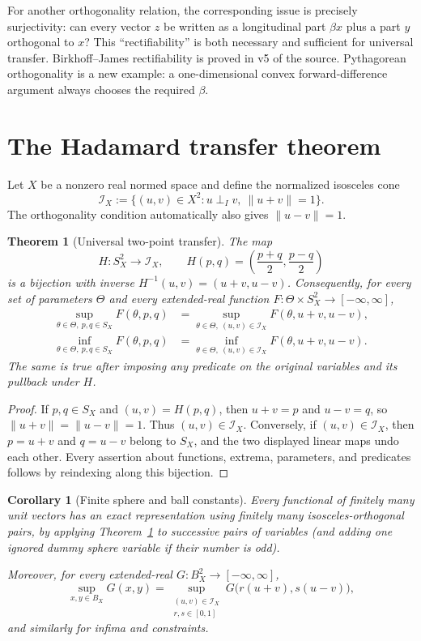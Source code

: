 \documentclass[11pt]{article}
\newtheorem{theorem}{Theorem}
\newtheorem{corollary}{Corollary}
\newcommand{\SX}{S_X}
\newcommand{\BX}{B_X}
\newcommand{\perpI}{\mathrel{\perp_I}}
\begin{document}
For another orthogonality relation, the corresponding issue is precisely
surjectivity: can every vector $z$ be written as a longitudinal part
$\beta x$ plus a part $y$ orthogonal to $x$?  This ``rectifiability'' is both
necessary and sufficient for universal transfer.  Birkhoff--James
rectifiability is proved in v5 of the source.  Pythagorean orthogonality is a
new example: a one-dimensional convex forward-difference argument always
chooses the required $\beta$.

\section{The Hadamard transfer theorem}

Let $X$ be a nonzero real normed space and define the normalized isosceles
cone
\[
 \mathcal I_X:=\{(u,v)\in X^2:u\perpI v,\ \|u+v\|=1\}.
\]
The orthogonality condition automatically also gives $\|u-v\|=1$.

\begin{theorem}[Universal two-point transfer]\label{thm:hadamard}
The map
\[
 H:\SX^2\longrightarrow\mathcal I_X,
 \qquad H(p,q)=\left(\frac{p+q}{2},\frac{p-q}{2}\right)
\]
is a bijection with inverse $H^{-1}(u,v)=(u+v,u-v)$.  Consequently, for every
set of parameters $\Theta$ and every extended-real function
$F:\Theta\times\SX^2\to[-\infty,\infty]$,
\begin{align*}
 \sup_{\theta\in\Theta,\ p,q\in\SX}F(\theta,p,q)
 &=\sup_{\theta\in\Theta,\ (u,v)\in\mathcal I_X}
   F(\theta,u+v,u-v),\\
 \inf_{\theta\in\Theta,\ p,q\in\SX}F(\theta,p,q)
 &=\inf_{\theta\in\Theta,\ (u,v)\in\mathcal I_X}
   F(\theta,u+v,u-v).
\end{align*}
The same is true after imposing any predicate on the original variables and
its pullback under $H$.
\end{theorem}

\begin{proof}
If $p,q\in\SX$ and $(u,v)=H(p,q)$, then $u+v=p$ and $u-v=q$, so
$\|u+v\|=\|u-v\|=1$.  Thus $(u,v)\in\mathcal I_X$.  Conversely, if
$(u,v)\in\mathcal I_X$, then $p=u+v$ and $q=u-v$ belong to $\SX$, and the two
displayed linear maps undo each other.  Every assertion about functions,
extrema, parameters, and predicates follows by reindexing along this
bijection.
\end{proof}

\begin{corollary}[Finite sphere and ball constants]\label{cor:finite}
Every functional of finitely many unit vectors has an exact representation
using finitely many isosceles-orthogonal pairs, by applying
Theorem~\ref{thm:hadamard} to successive pairs of variables (and adding one
ignored dummy sphere variable if their number is odd).

Moreover, for every extended-real $G:\BX^2\to[-\infty,\infty]$,
\[
 \sup_{x,y\in\BX}G(x,y)
 =\sup_{\substack{(u,v)\in\mathcal I_X\\r,s\in[0,1]}}
 G\bigl(r(u+v),s(u-v)\bigr),
\]
and similarly for infima and constraints.
\end{corollary}
\end{document}
